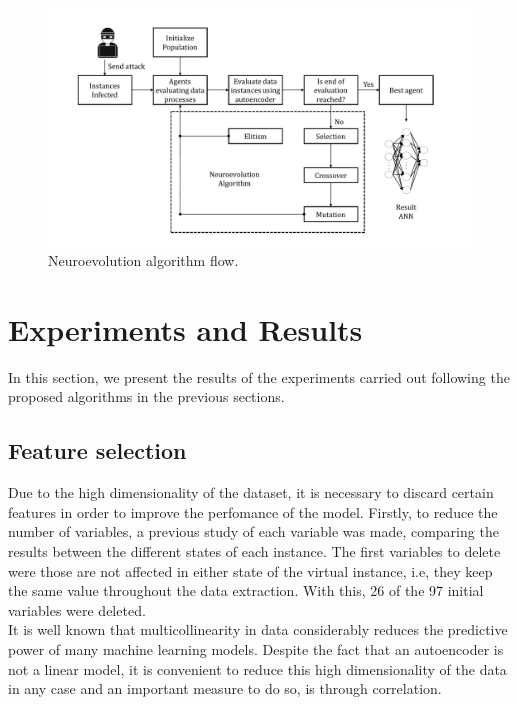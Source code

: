 \documentclass{iosart2c}
\begin{document}
\begin{figure}[h!]
\includegraphics[scale=0.5]{figs/neuroevolution/diag_neuroevolution.pdf}
\vspace{-0.5cm}
\caption{Neuroevolution algorithm flow.}
\label{fig:diagneuroevolution}
\end{figure}




\section{Experiments and Results}
In this section, we present the results of the experiments carried out following the proposed algorithms in the previous sections. 



\subsection{Feature selection}

Due to the high dimensionality of the dataset, it is necessary to discard certain features in order to improve the perfomance of the model. Firstly, to reduce the number of variables, a previous study of each variable was made, comparing the results between the different states of each instance. The first variables to delete were those are not affected in either state of the virtual instance, i.e, they keep the same value throughout the data extraction. With this, 26 of the 97 initial variables were deleted. \\

It is well known that multicollinearity in data considerably reduces the predictive power of many machine learning models. Despite the fact that an autoencoder is not a linear model, it is convenient to reduce this high dimensionality of the data in any case and an important measure to do so, is through correlation. \\
\end{document}
